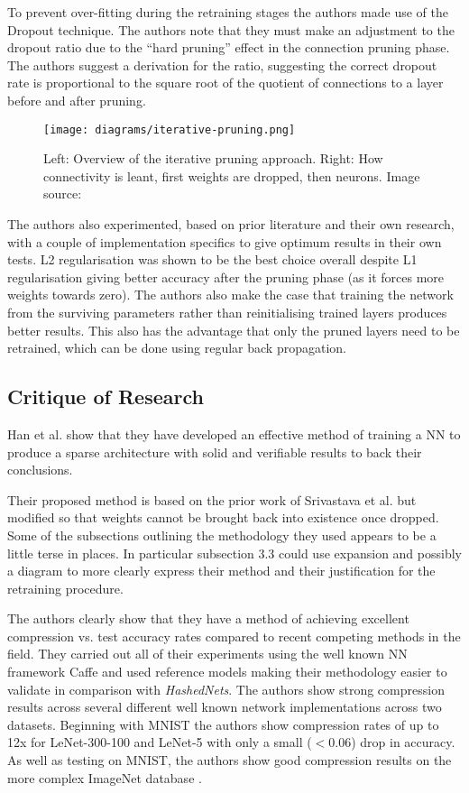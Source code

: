\documentclass[journal]{IEEEtran}
\begin{document}
To prevent over-fitting during the retraining stages the authors made use of the Dropout \cite{srivastava2014dropout} technique. The authors note that they must make an adjustment to the dropout ratio due to the ``hard pruning'' effect in the connection pruning phase. The authors suggest a derivation for the ratio, suggesting the correct dropout rate is proportional to the square root of the quotient of connections to a layer before and after pruning.

\begin{figure}[h!]
\centering
\texttt{[image: diagrams/iterative-pruning.png]}
\caption{Left: Overview of the iterative pruning approach. Right: How connectivity is leant, first weights are dropped, then neurons. Image source: \cite{han2015learning}}
\label{fig:iterative-pruning}
\end{figure}

The authors also experimented, based on prior literature and their own research, with a couple of implementation specifics to give optimum results in their own tests. L2 regularisation was shown to be the best choice overall despite L1 regularisation giving better accuracy after the pruning phase (as it forces more weights towards zero). The authors also make the case that training the network from the surviving parameters rather than reinitialising trained layers produces better results. This also has the advantage that only the pruned layers need to be retrained, which can be done using regular back propagation.

\subsection{Critique of Research}
Han et al. \cite{han2015learning} show that they have developed an effective method of training a NN to produce a sparse architecture with solid and verifiable results to back their conclusions.

Their proposed method is based on the prior work of Srivastava et al. \cite{srivastava2014dropout} but modified so that weights cannot be brought back into existence once dropped. Some of the subsections outlining the methodology they used appears to be a little terse in places. In particular subsection 3.3 could use expansion and possibly a diagram to more clearly express their method and their justification for the retraining procedure.

The authors clearly show that they have a method of achieving excellent compression vs. test accuracy rates compared to recent competing methods in the field. They carried out all of their experiments using the well known NN framework Caffe \cite{jia2014caffe} and used reference models making their methodology easier to validate in comparison with \textit{HashedNets}. The authors show strong compression results across several different well known network implementations across two datasets. Beginning with MNIST \cite{lecun1998gradient} the authors show compression rates of up to 12x for LeNet-300-100 and LeNet-5 with only a small ($< 0.06$) drop in accuracy. As well as testing on MNIST, the authors show good compression results on the more complex ImageNet database \cite{deng2009imagenet}.
\end{document}
